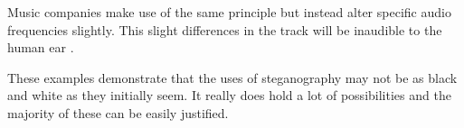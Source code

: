 Music companies make use of the same principle but instead alter specific audio frequencies slightly.
This slight differences in the track will be inaudible to the human ear \citep{Anderson1998}.

These examples demonstrate that the uses of steganography may not be as black and white as they initially seem.
It really does hold a lot of possibilities and the majority of these can be easily justified.